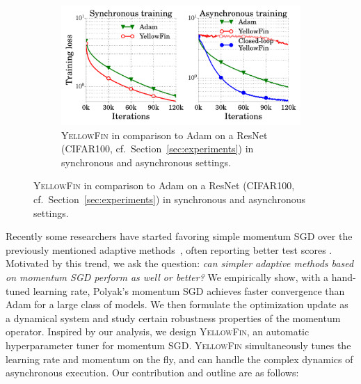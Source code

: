 \documentclass{article}
\newcommand{\tuner}{\textsc{YellowFin}\xspace}
\begin{document}
\begin{figure}
\vspace{-2.25em}
\begin{minipage}{1.0\linewidth}
\begin{figure}[H]
	\includegraphics[width=0.99\linewidth]{experiment_results/spotlight.pdf}
	\caption{\tuner in comparison to Adam on a ResNet (CIFAR100, cf.\ Section~\ref{sec:experiments}) in synchronous and asynchronous settings.}
	\label{fig:spotlight}
\end{figure}
\end{minipage}
\end{figure}
Recently some researchers
 have started favoring simple momentum SGD over the previously mentioned adaptive methods~\citep{chen2016thorough,gehring2017convolutional}, often reporting better test scores \citep{wilson2017marginal}.
Motivated by this trend, we ask the question:
\emph{can simpler adaptive methods based on momentum SGD perform as well or better?}
We empirically show, with a hand-tuned learning rate, Polyak's momentum SGD achieves faster convergence than Adam for a large class of models.
We then formulate the optimization update as a dynamical system and study certain robustness properties of the momentum operator.
Inspired by our analysis, we design \tuner, an automatic hyperparameter tuner for momentum SGD.
\tuner simultaneously tunes the learning rate and momentum on the fly, and can handle the complex dynamics of asynchronous execution.
Our contribution and outline are as follows:
\end{document}
